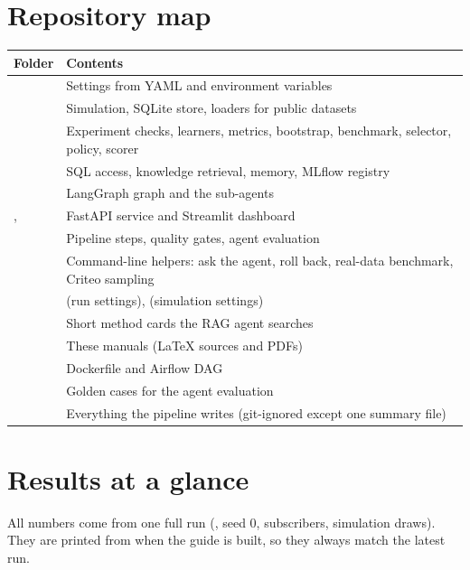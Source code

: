 \documentclass[11pt]{article}
\begin{document}
\section{Repository map}
\begin{tabularx}{\textwidth}{@{}lL@{}}
\toprule
Folder & Contents \\
\midrule
{} & Settings from YAML and environment variables \\
 & Simulation, SQLite store, loaders for public datasets \\
 & Experiment checks, learners, metrics, bootstrap, benchmark, selector, policy, scorer \\
 & SQL access, knowledge retrieval, memory, MLflow registry \\
 & LangGraph graph and the sub-agents \\
,  & FastAPI service and Streamlit dashboard \\
 & Pipeline steps, quality gates, agent evaluation \\
 & Command-line helpers: ask the agent, roll back, real-data benchmark, Criteo sampling \\
 &  (run settings),  (simulation settings) \\
 & Short method cards the RAG agent searches \\
 & These manuals (LaTeX sources and PDFs) \\
 & Dockerfile and Airflow DAG \\
 & Golden cases for the agent evaluation \\
 & Everything the pipeline writes (git-ignored except one summary file) \\
\bottomrule
\end{tabularx}

\section{Results at a glance}
\label{sec:results}
All numbers come from one full run (, seed 0, \RnSubs{} subscribers, \Rdraws{} simulation draws). They are printed from  when the guide is built, so they always match the latest run.
\end{document}
